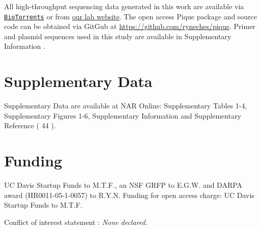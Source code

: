 \begin{refsection}
All high-throughput sequencing data generated in this work are available via \href{http://www.biotorrents.net/details.php?id=259}{\tt BioTorrents} or from \href{http://www.bme.ucdavis.edu/facciotti/resources_data/data/}{our lab website}. The open access Pique package and source code can be obtained via GitGub at \url{https://github.com/ryneches/pique}. Primer and plasmid sequences used in this study are available in Supplementary Information .

\section{Supplementary Data}

Supplementary Data are available at NAR Online: Supplementary Tables 1-4, Supplementary Figures 1-6, Supplementary Information and Supplementary Reference ( 44 ).

\section{Funding}

UC Davis Startup Funds to M.T.F., an NSF GRFP to E.G.W. and DARPA award (HR0011-05-1-0057) to R.Y.N. Funding for open access charge: UC Davis Startup Funds to M.T.F.

Conflict of interest statement : {\em None declared.}

\printbibliography[heading=subbibliography]

\end{refsection}
